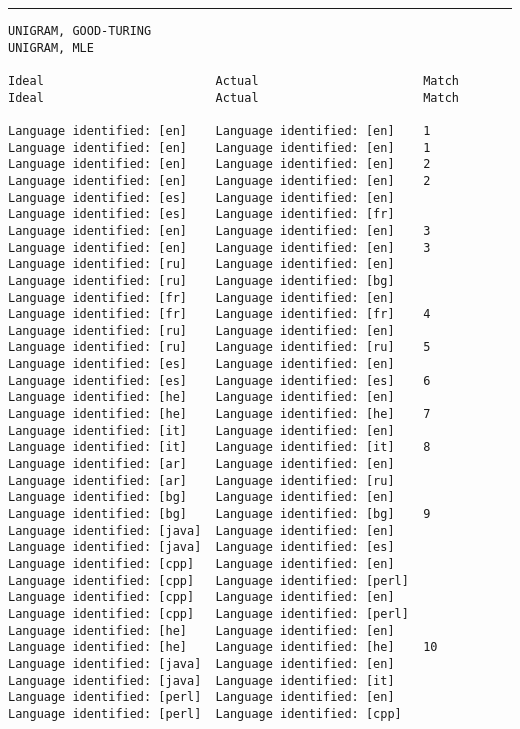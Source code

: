 \tiny
\hrule\vskip4pt
\begin{verbatim}
UNIGRAM, GOOD-TURING                                               UNIGRAM, MLE

Ideal                        Actual                       Match    Ideal                        Actual                       Match

Language identified: [en]    Language identified: [en]    1        Language identified: [en]    Language identified: [en]    1
Language identified: [en]    Language identified: [en]    2        Language identified: [en]    Language identified: [en]    2
Language identified: [es]    Language identified: [en]             Language identified: [es]    Language identified: [fr]
Language identified: [en]    Language identified: [en]    3        Language identified: [en]    Language identified: [en]    3
Language identified: [ru]    Language identified: [en]             Language identified: [ru]    Language identified: [bg]
Language identified: [fr]    Language identified: [en]             Language identified: [fr]    Language identified: [fr]    4
Language identified: [ru]    Language identified: [en]             Language identified: [ru]    Language identified: [ru]    5
Language identified: [es]    Language identified: [en]             Language identified: [es]    Language identified: [es]    6
Language identified: [he]    Language identified: [en]             Language identified: [he]    Language identified: [he]    7
Language identified: [it]    Language identified: [en]             Language identified: [it]    Language identified: [it]    8
Language identified: [ar]    Language identified: [en]             Language identified: [ar]    Language identified: [ru]
Language identified: [bg]    Language identified: [en]             Language identified: [bg]    Language identified: [bg]    9
Language identified: [java]  Language identified: [en]             Language identified: [java]  Language identified: [es]
Language identified: [cpp]   Language identified: [en]             Language identified: [cpp]   Language identified: [perl]
Language identified: [cpp]   Language identified: [en]             Language identified: [cpp]   Language identified: [perl]
Language identified: [he]    Language identified: [en]             Language identified: [he]    Language identified: [he]    10
Language identified: [java]  Language identified: [en]             Language identified: [java]  Language identified: [it]
Language identified: [perl]  Language identified: [en]             Language identified: [perl]  Language identified: [cpp]

\end{verbatim}
